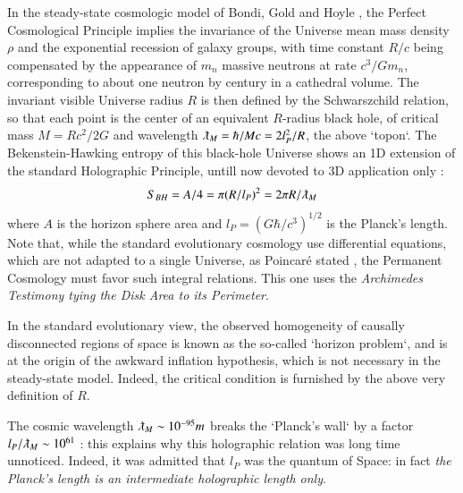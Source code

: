 \documentclass[twoside,draft]{article}
\begin{document}
\begin{sloppypar}
{In the steady-state cosmologic model of Bondi, Gold and Hoyle \cite{Sanchez1}, the Perfect Cosmological
Principle implies the invariance of the Universe mean mass density $\rho$ and the exponential recession
of galaxy groups, with time constant $R/c$ being compensated by the appearance of $m_n$ massive
neutrons at rate $c^{3} /Gm_{n}$, corresponding to about one neutron by century in a cathedral volume. The invariant visible Universe radius $R$ is then defined by the
Schwarszchild relation, so that each point is the center of an equivalent $R$-radius black hole, of
critical mass $M = Rc^{2} /2G$ and wavelength $\lambdabar_M = \hbar/Mc = 2l_{P}^{2} /R$, the above `topon`. The Bekenstein-Hawking entropy of this black-hole Universe shows an 1D extension of the standard Holographic
Principle, untill now devoted to 3D application only \cite{Bousso}:
\begin{equation}
S_{BH} = A/4 = \pi(R/l_{P})^{2} = 2\pi R/\lambdabar_{M}
\end{equation}
where $A$ is the horizon sphere area and $l_{P} = (G\hbar/c^{3} )^{1/2}$ is the Planck's length. Note that, while the standard evolutionary cosmology use differential equations, which are not adapted to a single Universe, as Poincar\'{e} stated \cite{Sanchez1}, the Permanent Cosmology must favor such integral relations. This one
uses the \textit{Archimedes Testimony tying the Disk Area to its Perimeter}.

In the standard evolutionary view, the observed homogeneity of causally disconnected regions
of space is known as the so-called `horizon problem`, and is at the origin of the awkward inflation
hypothesis, which is not necessary in the steady-state model. Indeed, the critical condition is
furnished by the above very definition of $R$.

The cosmic wavelength $\lambdabar_{M}\sim 10^{-95} m$ breaks the `Planck's wall` by a factor $l_{P}/\lambdabar_{M}\sim 10^{61}$ : this explains why this holographic relation was long time unnoticed. Indeed, it was admitted that $l_{P}$ was the quantum of Space: in fact \textit{the Planck's length is an intermediate holographic length only}.

}
\end{sloppypar}
\end{document}
